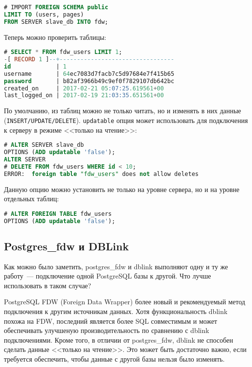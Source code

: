 \begin{lstlisting}[language=SQL,label=lst:postgresfdw5,caption=Импортируем таблицы]
# IMPORT FOREIGN SCHEMA public
LIMIT TO (users, pages)
FROM SERVER slave_db INTO fdw;
\end{lstlisting}

Теперь можно проверить таблицы:

\begin{lstlisting}[language=SQL,label=lst:postgresfdw6,caption=SELECT]
# SELECT * FROM fdw_users LIMIT 1;
-[ RECORD 1 ]--+---------------------------------
id             | 1
username       | 64ec7083d7facb7c5d97684e7f415b65
password       | b82af3966b49c9ef0f7829107db642bc
created_on     | 2017-02-21 05:07:25.619561+00
last_logged_on | 2017-02-19 21:03:35.651561+00
\end{lstlisting}

По умолчанию, из таблиц можно не только читать, но и изменять в них данные (\lstinline!INSERT/UPDATE/DELETE!). \lstinline!updatable! опция может использовать для подключения к серверу в режиме <<только на чтение>>:

\begin{lstlisting}[language=SQL,label=lst:postgresfdw7,caption=Read-only mode]
# ALTER SERVER slave_db
OPTIONS (ADD updatable 'false');
ALTER SERVER
# DELETE FROM fdw_users WHERE id < 10;
ERROR:  foreign table "fdw_users" does not allow deletes
\end{lstlisting}

Данную опцию можно установить не только на уровне сервера, но и на уровне отдельных таблиц:

\begin{lstlisting}[language=SQL,label=lst:postgresfdw8,caption=Read-only mode для таблицы]
# ALTER FOREIGN TABLE fdw_users
OPTIONS (ADD updatable 'false');
\end{lstlisting}


\subsection{Postgres\_fdw и DBLink}

Как можно было заметить, postgres\_fdw и dblink выполняют одну и ту же работу~--- подключение одной PostgreSQL базы к другой. Что лучше использовать в таком случае?

PostgreSQL FDW (Foreign Data Wrapper) более новый и рекомендуемый метод подключения к другим источникам данных. Хотя функциональность dblink похожа на FDW, последний является более SQL совместимым и может обеспечивать улучшеную производительность по сравнению с dblink подключениями. Кроме того, в отличии от postgres\_fdw, dblink не способен сделать данные <<только на чтение>>. Это может быть достаточно важно, если требуется обеспечить, чтобы данные с другой базы нельзя было изменять.

